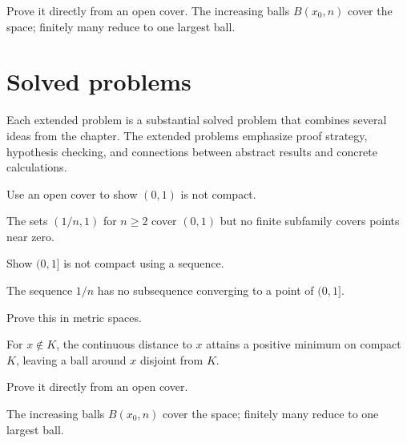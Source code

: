 \begin{example}\label{ex:ii06-worked-04}
Prove it directly from an open cover. The increasing balls $B(x_0,n)$ cover the space; finitely many reduce to one largest ball.
\end{example}

\section{Solved problems}
Each extended problem is a substantial solved problem that combines several ideas from the chapter. The extended problems emphasize proof strategy, hypothesis checking, and connections between abstract results and concrete calculations.

\begin{problem}\label{prob:ii06-problem-01}
Use an open cover to show $(0,1)$ is not compact.
\end{problem}
\begin{solution}
The sets $(1/n,1)$ for $n\ge2$ cover $(0,1)$ but no finite subfamily covers points near zero.
\end{solution}

\begin{problem}\label{prob:ii06-problem-02}
Show $(0,1]$ is not compact using a sequence.
\end{problem}
\begin{solution}
The sequence $1/n$ has no subsequence converging to a point of $(0,1]$.
\end{solution}

\begin{problem}\label{prob:ii06-problem-03}
Prove this in metric spaces.
\end{problem}
\begin{solution}
For $x\notin K$, the continuous distance to $x$ attains a positive minimum on compact $K$, leaving a ball around $x$ disjoint from $K$.
\end{solution}

\begin{problem}\label{prob:ii06-problem-04}
Prove it directly from an open cover.
\end{problem}
\begin{solution}
The increasing balls $B(x_0,n)$ cover the space; finitely many reduce to one largest ball.
\end{solution}

